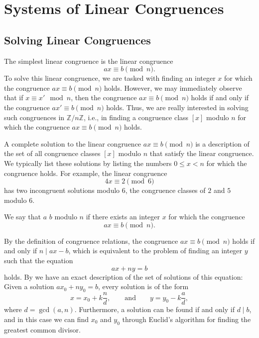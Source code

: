 \chapter{Systems of Linear Congruences}\label{chapter:systems-of-linear-congruences}

\section{Solving Linear Congruences}\label{section:solving-linear-congruences}

The simplest linear congruence is the linear congruence
\begin{equation*}
  ax\equiv b\pmod{n}.
\end{equation*}
To solve this linear congruence, we are tasked with finding an integer $x$ for which the congruence $ax\equiv b\pmod{n}$ holds. However, we may immediately observe that if $x\equiv x' \mod{n}$, then the congruence $ax\equiv b\pmod{n}$ holds if and only if the congruence $ax'\equiv b\pmod{n}$ holds. Thus, we are really interested in solving such congruences in $\mathbb{Z}/n\mathbb{Z}$, i.e., in finding a congruence class $[x]$ modulo $n$ for which the congruence $ax\equiv b\pmod{n}$ holds.

A complete solution to the linear congruence $ax\equiv b\pmod{n}$ is a description of the set of all congruence classes $[x]$ modulo $n$ that satisfy the linear congruence. We typically list these solutions by listing the numbers $0\leq x < n$ for which the congruence holds. For example, the linear congruence
\begin{equation*}
  4x\equiv 2\pmod{6}
\end{equation*}
has two incongruent solutions modulo $6$, the congruence classes of $2$ and $5$ modulo $6$.

\begin{definition}
  We say that $a$  $b$ modulo $n$ if there exists an integer $x$ for which the congruence
  \begin{equation*}
    ax\equiv b\pmod{n}.
  \end{equation*}
\end{definition}

By the definition of congruence relations, the congruence $ax\equiv b\pmod{n}$ holds if and only if $n\mid ax-b$, which is equivalent to the problem of finding an integer $y$ such that the equation
\begin{equation*}
  ax+ny=b
\end{equation*}
holds. By  we have an exact description of the set of solutions of this equation: Given a solution $ax_0+ny_0=b$, every solution is of the form
\begin{equation*}
  x = x_0 + k\frac{n}{d},\qquad\text{and}\qquad y=y_0-k\frac{a}{d},
\end{equation*}
where $d=\gcd(a,n)$. Furthermore, a solution can be found if and only if $d\mid b$, and in this case we can find $x_0$ and $y_0$ through Euclid's algorithm for finding the greatest common divisor.


